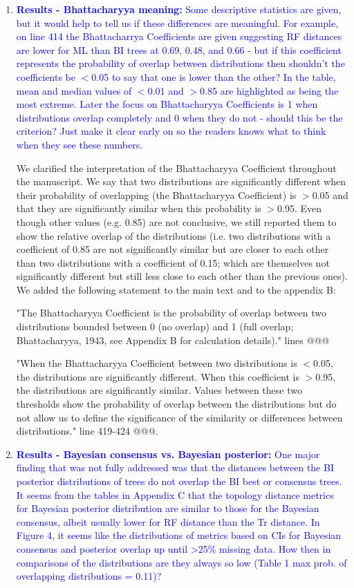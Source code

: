 \documentclass[12pt,letterpaper]{article}
\begin{document}
\begin{enumerate}
\item{\textcolor{blue}{\textbf{Results - Bhattacharyya meaning:} Some descriptive statistics are given, but it would help to tell us if these differences are meaningful.
For example, on line 414 the Bhattacharrya Coefficients are given suggesting RF distances are lower for ML than BI trees at 0.69, 0.48, and 0.66 - but if this coefficient represents the probability of overlap between distributions then shouldn't the coefficients be $<$0.05 to say that one is lower than the other?
In the table, mean and median values of $<$0.01 and $>$0.85 are highlighted as being the most extreme.
Later the focus on Bhattacharyya Coefficients is 1 when distributions overlap completely and 0 when they do not - should this be the criterion?
Just make it clear early on so the readers knows what to think when they see these numbers. }}

We clarified the interpretation of the Bhattacharyya Coefficient throughout the manuscript.
We say that two distributions are significantly different when their probability of overlapping (the Bhattacharyya Coefficient) is $>$0.05 and that they are significantly similar when this probability is $>$0.95.
Even though other values (e.g. 0.85) are not conclusive, we still reported them to show the relative overlap of the distributions (i.e. two distributions with a coefficient of 0.85 are not significantly similar but are closer to each other than two distributions with a coefficient of 0.15; which are themselves not significantly different but still less close to each other than the previous ones).
We added the following statement to the main text and to the appendix B:

"The Bhattacharyya Coefficient is the probability of overlap between two distributions bounded between 0 (no overlap) and 1 (full overlap; Bhattacharyya, 1943, see Appendix B for calculation details)." lines @@@

"When the Bhattacharyya Coefficient between two distributions is $<$0.05, the distributions are significantly different.
When this coefficient is $>$0.95, the distributions are significantly similar.
Values between these two thresholds show the probability of overlap between the distributions but do not allow us to define the significance of the similarity or differences between distributions." line 419-424 @@@.

\item{\textcolor{blue}{\textbf{Results - Bayesian consensus vs. Bayesian posterior:} One major finding that was not fully addressed was that the distances between the BI posterior distributions of trees do not overlap the BI best or consensus trees.
It seems from the tables in Appendix C that the topology distance metrics for Bayesian posterior distribution are similar to those for the Bayesian consensus, albeit usually lower for RF distance than the Tr distance.
In Figure 4, it seems like the distributions of metrics based on CIs for Bayesian consensus and posterior overlap up until >25\% missing data.
How then in comparisons of the distributions are they always so low (Table 1 max prob. of overlapping distributions = 0.11)?}}


\end{enumerate}
\end{document}
